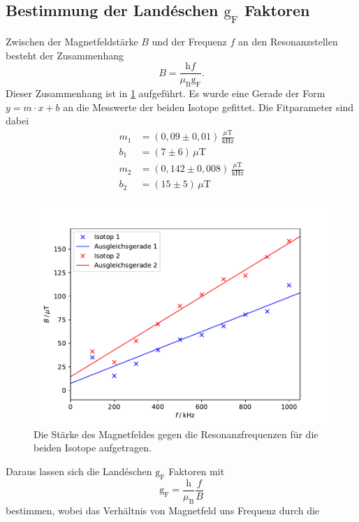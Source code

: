 \subsection{Bestimmung der Landéschen $\text{g}_{\text{F}}$ Faktoren}
Zwischen der Magnetfeldstärke $B$ und der Frequenz $f$ an den Resonanzstellen besteht der Zusammenhang
\begin{equation}
  B=\frac{\text{h}f}{\mu_{\text{B}} \text{g}_{\text{F}}} .
\end{equation}
Dieser Zusammenhang ist in \ref{fig:BFelder} aufgeführt. Es wurde eine Gerade der
Form $y=m\cdot x+b$ an die Messwerte der beiden Isotope gefittet. Die Fitparameter sind dabei
\begin{align*}
  m_1&=(0,09 \pm 0,01)\,\frac{\mu\text{T}}{\text{kHz}} \\
  b_1&=(7 \pm 6)\,\mu\text{T}\\
  m_2&=(0,142 \pm 0,008)\,\frac{\mu\text{T}}{\text{kHz}} \\
  b_2&=(15 \pm 5)\,\mu\text{T}
\end{align*}
\begin{figure}
  \centering
  \includegraphics{plots/BFelder.pdf}
  \caption{Die Stärke des Magnetfeldes gegen die Resonanzfrequenzen für die beiden Isotope
  aufgetragen.}
  \label{fig:BFelder}
\end{figure}
Daraus lassen sich die Landéschen $\text{g}_{\text{F}}$ Faktoren mit
\begin{equation}
  \text{g}_{\text{F}}=\frac{\text{h}}{\mu_{\text{B}}} \frac{f}{B}
\end{equation}
bestimmen, wobei das Verhältnis von Magnetfeld uns Frequenz durch die
